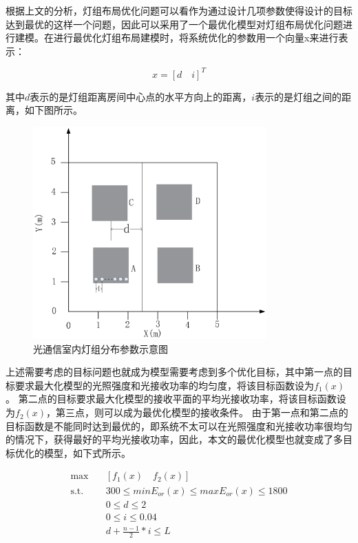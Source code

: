 根据上文的分析，灯组布局优化问题可以看作为通过设计几项参数使得设计的目标达到最优的这样一个问题，因此可以采用了一个最优化模型对灯组布局优化问题进行建模。在进行最优化灯组布局建模时，将系统优化的参数用一个向量x来进行表示：

\begin{equation}
    x=\left[d \quad i\right]^T
\end{equation}

其中$d$表示的是灯组距离房间中心点的水平方向上的距离，$i$表示的是灯组之间的距离，如下图所示。

\begin{figure}[htbp]
    \centering
	\includegraphics[width=0.8\textwidth]{figures/chapter-3/LedLayoutDI.eps}
	\caption{光通信室内灯组分布参数示意图}
	\label{fig:led-layout-d-i}
\end{figure}

上述需要考虑的目标问题也就成为模型需要考虑到多个优化目标，其中第一点的目标要求最大化模型的光照强度和光接收功率的均匀度，将该目标函数设为$f_{1}(x)$。
第二点的目标要求最大化模型的接收平面的平均光接收功率，将该目标函数设为$f_{2}(x)$，第三点，则可以成为最优化模型的接收条件。
由于第一点和第二点的目标函数是不能同时达到最优的，即系统不太可以在光照强度和光接收功率很均匀的情况下，获得最好的平均光接收功率，因此，本文的最优化模型也就变成了多目标优化的模型，如下式所示。

\begin{equation}
\begin{aligned}
    \max\quad & \left[f_{1}(x) \quad f_{2}(x)\right] \\
    \mbox{s.t.}\quad & 300\le minE_{or}(x) \le maxE_{or}(x) \le 1800 \\
           & 0 \le d \le 2   \\
           & 0 \le i \le 0.04 \\
           & d+\frac{n-1}{2}*i \le L
\end{aligned}
\end{equation}



